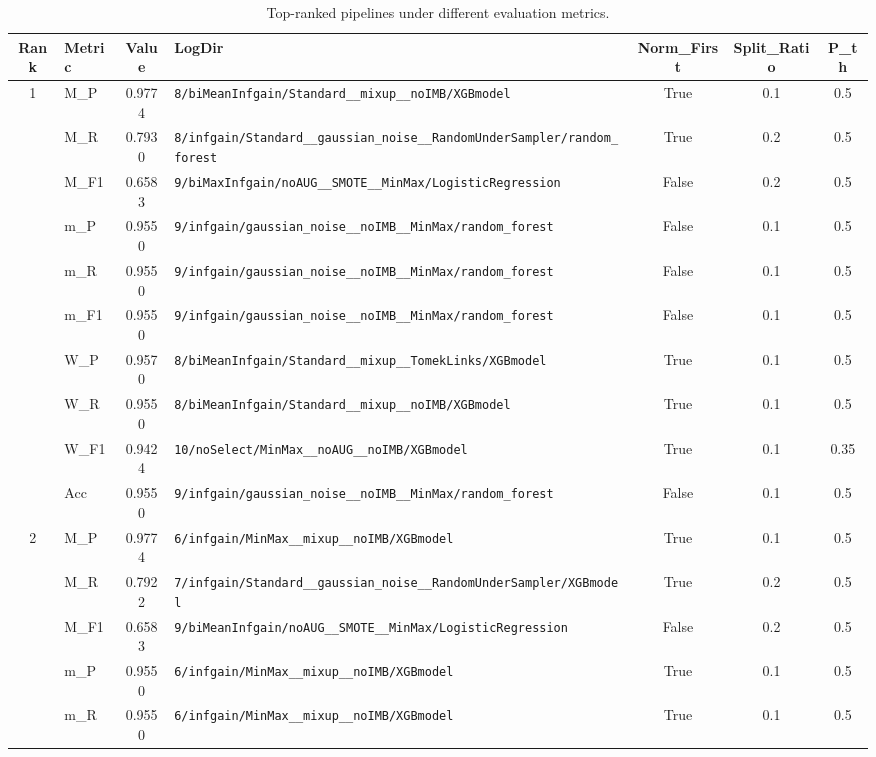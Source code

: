 \begin{table}[htbp]
\caption{Top-ranked pipelines under different evaluation metrics.}
\label{tab:rank_metric_vertical}
\centering
\small
\setlength{\tabcolsep}{4pt}
\begin{tabular}{|c|l|c|>{\ttfamily\footnotesize}p{7.2cm}|c|c|c|}
\hline
Rank & Metric & Value & LogDir & Norm\_First & Split\_Ratio & P\_th \\
\hline
\multirow{10}{*}{1} & M\_P & 0.9774 & \texttt{8/biMeanInfgain/Standard\_\_mixup\_\_noIMB/XGBmodel} & True & 0.1 & 0.5 \\
 & M\_R & 0.7930 & \texttt{8/infgain/Standard\_\_gaussian\_noise\_\_RandomUnderSampler/random\_forest} & True & 0.2 & 0.5 \\
 & M\_F1 & 0.6583 & \texttt{9/biMaxInfgain/noAUG\_\_SMOTE\_\_MinMax/LogisticRegression} & False & 0.2 & 0.5 \\
 & m\_P & 0.9550 & \texttt{9/infgain/gaussian\_noise\_\_noIMB\_\_MinMax/random\_forest} & False & 0.1 & 0.5 \\
 & m\_R & 0.9550 & \texttt{9/infgain/gaussian\_noise\_\_noIMB\_\_MinMax/random\_forest} & False & 0.1 & 0.5 \\
 & m\_F1 & 0.9550 & \texttt{9/infgain/gaussian\_noise\_\_noIMB\_\_MinMax/random\_forest} & False & 0.1 & 0.5 \\
 & W\_P & 0.9570 & \texttt{8/biMeanInfgain/Standard\_\_mixup\_\_TomekLinks/XGBmodel} & True & 0.1 & 0.5 \\
 & W\_R & 0.9550 & \texttt{8/biMeanInfgain/Standard\_\_mixup\_\_noIMB/XGBmodel} & True & 0.1 & 0.5 \\
 & W\_F1 & 0.9424 & \texttt{10/noSelect/MinMax\_\_noAUG\_\_noIMB/XGBmodel} & True & 0.1 & 0.35 \\
 & Acc & 0.9550 & \texttt{9/infgain/gaussian\_noise\_\_noIMB\_\_MinMax/random\_forest} & False & 0.1 & 0.5 \\
\hline
\multirow{10}{*}{2} & M\_P & 0.9774 & \texttt{6/infgain/MinMax\_\_mixup\_\_noIMB/XGBmodel} & True & 0.1 & 0.5 \\
 & M\_R & 0.7922 & \texttt{7/infgain/Standard\_\_gaussian\_noise\_\_RandomUnderSampler/XGBmodel} & True & 0.2 & 0.5 \\
 & M\_F1 & 0.6583 & \texttt{9/biMeanInfgain/noAUG\_\_SMOTE\_\_MinMax/LogisticRegression} & False & 0.2 & 0.5 \\
 & m\_P & 0.9550 & \texttt{6/infgain/MinMax\_\_mixup\_\_noIMB/XGBmodel} & True & 0.1 & 0.5 \\
 & m\_R & 0.9550 & \texttt{6/infgain/MinMax\_\_mixup\_\_noIMB/XGBmodel} & True & 0.1 & 0.5 \\

\end{tabular}
\end{table}
